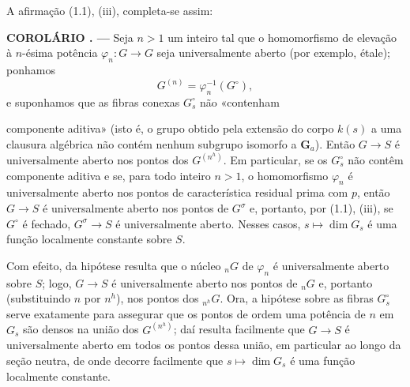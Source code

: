 \documentclass[11pt,twoside,openany]{book}
\numberwithin{equation}{section}
\newcommand{\src}[1]{%
  \phantomsection\hypertarget{src:#1}{}%
  \marginpar{\raggedleft\footnotesize\sffamily #1}%
}
\theoremstyle{plain}
\theoremstyle{definition}
\theoremstyle{remark}
\newcommand{\result}[2]{%
  \par\medskip\noindent\textbf{#1%
  \if\relax\detokenize{#2}\relax\else\space#2\fi. ---}\enspace
}
\newcommand{\FgaUnitKey}{frontmatter}
\renewcommand{\src}[1]{%
  \phantomsection\hypertarget{src:\FgaUnitKey:#1}{}%
  \marginpar{\raggedleft\footnotesize\sffamily #1}%
}
\begin{document}
A afirmação (1.1), (iii), completa-se assim:

\result{COROLÁRIO}{1.5} Seja $n>1$ um inteiro tal que o homomorfismo de
elevação à $n$-ésima potência $\varphi_n:G\longrightarrow G$ seja
universalmente aberto (por exemplo, étale); ponhamos
\[
G^{(n)}=\varphi_n^{-1}(G^\circ),
\]
e suponhamos que as fibras conexas $G_s^\circ$ não «contenham
\src{228}
componente aditiva» (isto é, o grupo obtido pela extensão do corpo $k(s)$ a
uma clausura algébrica não contém nenhum subgrupo isomorfo a
$\mathbf G_a$). Então $G\longrightarrow S$ é universalmente aberto nos
pontos dos $G^{(n^h)}$. Em particular, se os $G_s^\circ$ não contêm componente
aditiva e se, para todo inteiro $n>1$, o homomorfismo $\varphi_n$ é
universalmente aberto nos pontos de característica residual prima com
$p$, então
$G\longrightarrow S$ é universalmente aberto nos pontos de $G^\sigma$ e,
portanto, por (1.1), (iii), se $G^\circ$ é fechado,
$G^\sigma\longrightarrow S$ é universalmente aberto. Nesses casos,
$s\longmapsto\dim G_s$ é uma função localmente constante sobre $S$.

Com efeito, da hipótese resulta que o núcleo ${}_nG$ de $\varphi_n$ é
universalmente aberto sobre $S$; logo, $G\longrightarrow S$ é universalmente
aberto nos pontos de ${}_nG$ e, portanto (substituindo $n$ por $n^h$), nos
pontos dos ${}_{n^h}G$. Ora, a hipótese sobre as fibras $G_s^\circ$ serve
exatamente para assegurar que os pontos de ordem uma potência de $n$ em $G_s$
são densos na união dos $G^{(n^h)}$; daí resulta facilmente que
$G\longrightarrow S$ é universalmente aberto em todos os pontos dessa união,
em particular ao longo da seção neutra, de onde decorre facilmente que
$s\longmapsto\dim G_s$ é uma função localmente constante.
\end{document}

